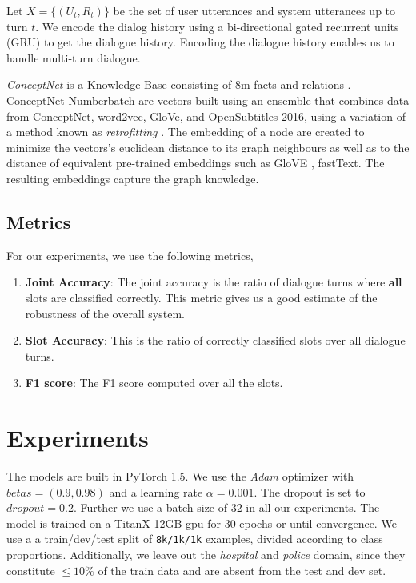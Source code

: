 \documentclass[12pt,a4paper]{article}
\begin{document}
Let $X = \{(U_t, R_t)\}$ be the set of user utterances and system utterances up to turn $t$. We encode the dialog history using a bi-directional gated recurrent units (GRU) to get the dialogue history. Encoding the dialogue history enables us to handle multi-turn dialogue.

\textit{ConceptNet} is a Knowledge Base consisting of 8m facts and relations \cite{Liu2004ConceptNetA}. ConceptNet Numberbatch are vectors built using an ensemble that combines data from ConceptNet, word2vec, GloVe, and OpenSubtitles 2016, using a variation of a method known as \textit{retrofitting} \cite{Speer2016ConceptNet5A}. The embedding of a node are created to minimize the vectors's euclidean distance to its graph neighbours as well as to the distance of equivalent pre-trained embeddings such as GloVE \cite{Pennington2014GloveGV}, fastText. The resulting embeddings capture the graph knowledge.

\subsection{Metrics}

For our experiments, we use the following metrics,

\begin{enumerate}
  \item \textbf{Joint Accuracy}: The joint accuracy is the ratio of dialogue turns where \textbf{all} slots are classified correctly. This metric gives us a good estimate of the robustness of the overall system.
  \item \textbf{Slot Accuracy}: This is the ratio of correctly classified slots over all dialogue turns.
  \item \textbf{F1 score}: The F1 score computed over all the slots.
\end{enumerate}

\section{Experiments}

The models are built in PyTorch 1.5. We use the \textit{Adam} optimizer with $betas = (0.9, 0.98)$ and a learning rate $\alpha = 0.001$. The dropout is set to $dropout = 0.2$. Further we use a batch size of $32$ in all our experiments. The model is trained on a TitanX 12GB gpu for 30 epochs or until convergence. We use a a train/dev/test split of \texttt{8k/1k/1k} examples, divided according to class proportions. Additionally, we leave out the \textit{hospital} and \textit{police} domain, since they constitute $\le 10\%$ of the train data and are absent from the test and dev set.
\end{document}
